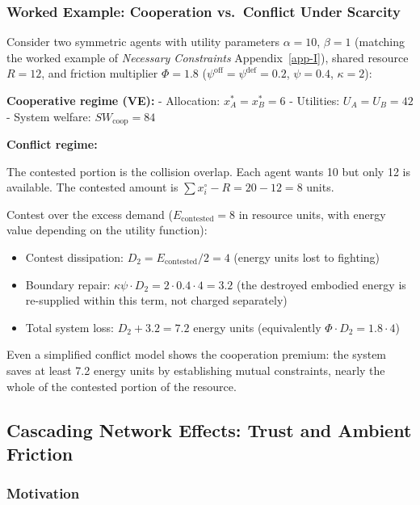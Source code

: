 \documentclass[11pt]{article}
\theoremstyle{plain}
\theoremstyle{definition}
\theoremstyle{remark}
\let\origsubsection\subsection
\renewcommand{\subsection}{\needspace{7\baselineskip}\origsubsection}
\let\origsubsubsection\subsubsection
\renewcommand{\subsubsection}{\needspace{4\baselineskip}\origsubsubsection}
\providecommand{\tightlist}{%
  \setlength{\itemsep}{0pt}\setlength{\parskip}{0pt}}
\begin{document}
\subsubsection{Worked Example: Cooperation vs.~Conflict Under
Scarcity}\label{worked-example-cooperation-vs.-conflict-under-scarcity}

Consider two symmetric agents with utility parameters \(\alpha = 10\),
\(\beta = 1\) (matching the worked example of \emph{Necessary
Constraints} Appendix~\ref{app-I}), shared resource \(R = 12\), and
friction multiplier \(\Phi = 1.8\)
(\(\psi^{\text{off}} = \psi^{\text{def}} = 0.2\), \(\psi = 0.4\),
\(\kappa = 2\)):

\textbf{Cooperative regime (VE):} - Allocation: \(x_A^* = x_B^* = 6\) -
Utilities: \(U_A = U_B = 42\) - System welfare:
\(SW_{\text{coop}} = 84\)

\textbf{Conflict regime:}

The contested portion is the collision overlap. Each agent wants 10 but
only 12 is available. The contested amount is
\(\sum x_i^{\circ} - R = 20 - 12 = 8\) units.

Contest over the excess demand (\(E_{\text{contested}} = 8\) in resource
units, with energy value depending on the utility function):

\begin{itemize}
\tightlist
\item
  Contest dissipation: \(D_2 = E_{\text{contested}}/2 = 4\) (energy
  units lost to fighting)
\item
  Boundary repair: \(\kappa \psi \cdot D_2 = 2 \cdot 0.4 \cdot 4 = 3.2\)
  (the destroyed embodied energy is re-supplied within this term, not
  charged separately)
\item
  Total system loss: \(D_2 + 3.2 = 7.2\) energy units (equivalently
  \(\Phi \cdot D_2 = 1.8 \cdot 4\))
\end{itemize}

Even a simplified conflict model shows the cooperation premium: the
system saves at least 7.2 energy units by establishing mutual
constraints, nearly the whole of the contested portion of the resource.

\subsection{Cascading Network Effects: Trust and Ambient
Friction}\label{cascading-network-effects-trust-and-ambient-friction}

\subsubsection{Motivation}\label{motivation}
\end{document}
